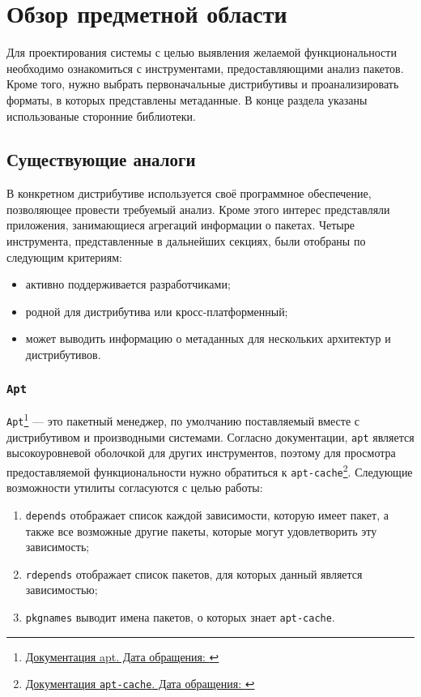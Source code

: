 
\section{Обзор предметной области}
\label{sec:relatedworks}
Для проектирования системы с целью выявления желаемой функциональности необходимо ознакомиться с инструментами, предоставляющими анализ пакетов.
Кроме того, нужно выбрать первоначальные дистрибутивы и проанализировать форматы, в которых представлены метаданные. В конце раздела указаны использованые сторонние библиотеки.

\subsection{Существующие аналоги}
В конкретном дистрибутиве используется своё программное обеспечение, позволяющее провести требуемый анализ. Кроме этого интерес представляли приложения, занимающиеся агрегаций информации о пакетах.
Четыре инструмента, представленные в дальнейших секциях, были отобраны по следующим критериям:

\begin{itemize}
	\item активно поддерживается разработчиками;
	\item родной для дистрибутива или кросс-платформенный;
	\item может выводить информацию о метаданных для нескольких архитектур и дистрибутивов.
\end{itemize}

\subsubsection{\texttt{Apt}}
\texttt{Apt}\footnote{\href{https://manpages.debian.org/stretch/apt/apt.8.en.html\#SCRIPT_USAGE_AND_DIFFERENCES_FROM_OTHER_APT_TOOLS/}{Документация apt. Дата обращения: }} --- это пакетный менеджер, по умолчанию поставляемый вместе с дистрибутивом {\debian} и производными системами.
Согласно документации, \texttt{apt} является высокоуровневой оболочкой для других инструментов, поэтому для просмотра предоставляемой функциональности нужно обратиться к \texttt{apt-cache}\footnote{\href{https://manpages.debian.org/stretch/apt/apt-cache.8.en.html}{Документация \texttt{apt-cache}. Дата обращения: }}.
Следующие возможности утилиты согласуются с целью работы:
\begin{enumerate}
	\item \texttt{depends} отображает список каждой зависимости, которую имеет пакет, а также все возможные другие пакеты, которые могут удовлетворить эту зависимость;
	\item \texttt{rdepends} отображает список пакетов, для которых данный является зависимостью;
	\item \texttt{pkgnames} выводит имена пакетов, о которых знает \texttt{apt-cache}.
\end{enumerate}

